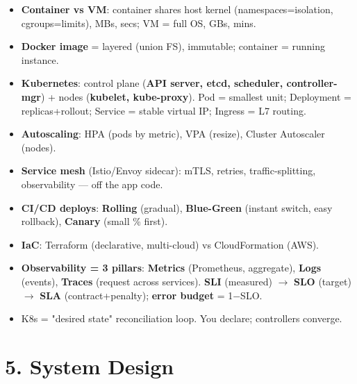 \documentclass[11pt]{article}
\providecommand{\tightlist}{\setlength{\itemsep}{1pt}\setlength{\parskip}{0pt}}
\begin{document}
\begin{itemize}
\tightlist
\item
  \textbf{Container vs VM}: container shares host kernel (namespaces=isolation, cgroups=limits), MBs, secs; VM = full OS, GBs, mins.
\item
  \textbf{Docker image} = layered (union FS), immutable; container = running instance.
\item
  \textbf{Kubernetes}: control plane (\textbf{API server, etcd, scheduler, controller-mgr}) + nodes (\textbf{kubelet, kube-proxy}). Pod = smallest unit; Deployment = replicas+rollout; Service = stable virtual IP; Ingress = L7 routing.
\item
  \textbf{Autoscaling}: HPA (pods by metric), VPA (resize), Cluster Autoscaler (nodes).
\item
  \textbf{Service mesh} (Istio/Envoy sidecar): mTLS, retries, traffic-splitting, observability --- off the app code.
\item
  \textbf{CI/CD deploys}: \textbf{Rolling} (gradual), \textbf{Blue-Green} (instant switch, easy rollback), \textbf{Canary} (small \% first).
\item
  \textbf{IaC}: Terraform (declarative, multi-cloud) vs CloudFormation (AWS).
\item
  \textbf{Observability = 3 pillars}: \textbf{Metrics} (Prometheus, aggregate), \textbf{Logs} (events), \textbf{Traces} (request across services). \textbf{SLI} (measured) \(\rightarrow\) \textbf{SLO} (target) \(\rightarrow\) \textbf{SLA} (contract+penalty); \textbf{error budget} = 1\(-\)SLO.
\item
  K8s = "desired state" reconciliation loop. You declare; controllers converge.
\end{itemize}

\section{5. System Design}\label{5-system-design}
\end{document}
